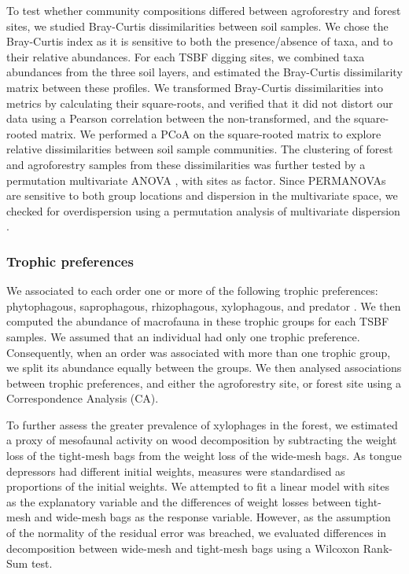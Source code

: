 \documentclass[fleqn,10pt]{ArtEcoFoG} %
\begin{document}
To test whether community compositions differed between agroforestry and forest sites, we studied Bray-Curtis dissimilarities between soil samples. We chose the Bray-Curtis index as it is sensitive to both the presence/absence of taxa, and to their relative abundances. For each TSBF digging sites, we combined taxa abundances from the three soil layers, and estimated the Bray-Curtis dissimilarity matrix between these profiles. We transformed Bray-Curtis dissimilarities into metrics by calculating their square-roots, and verified that it did not distort our data using a Pearson correlation between the non-transformed, and the square-rooted matrix. We performed a PCoA on the square-rooted matrix to explore relative dissimilarities between soil sample communities. The clustering of forest and agroforestry samples from these dissimilarities was further tested by a permutation multivariate ANOVA \citep[PERMANOVA,][]{kenett_permutational_2017}, with sites as factor. Since PERMANOVAs are sensitive to both group locations and dispersion in the multivariate space, we checked for overdispersion using a permutation analysis of multivariate dispersion \citep[PERMDISP,][]{anderson_distancebased_2006}.

\subsubsection{Trophic preferences}\label{trophic-preferences}

We associated to each order one or more of the following trophic preferences: phytophagous, saprophagous, rhizophagous, xylophagous, and predator \citep{decaens_identification_2015, potapov_feeding_2022}. We then computed the abundance of macrofauna in these trophic groups for each TSBF samples. We assumed that an individual had only one trophic preference. Consequently, when an order was associated with more than one trophic group, we split its abundance equally between the groups. We then analysed associations between trophic preferences, and either the agroforestry site, or forest site using a Correspondence Analysis (CA).

To further assess the greater prevalence of xylophages in the forest, we estimated a proxy of mesofaunal activity on wood decomposition by subtracting the weight loss of the tight-mesh bags from the weight loss of the wide-mesh bags. As tongue depressors had different initial weights, measures were standardised as proportions of the initial weights. We attempted to fit a linear model with sites as the explanatory variable and the differences of weight losses between tight-mesh and wide-mesh bags as the response variable. However, as the assumption of the normality of the residual error was breached, we evaluated differences in decomposition between wide-mesh and tight-mesh bags using a Wilcoxon Rank-Sum test.
\end{document}
